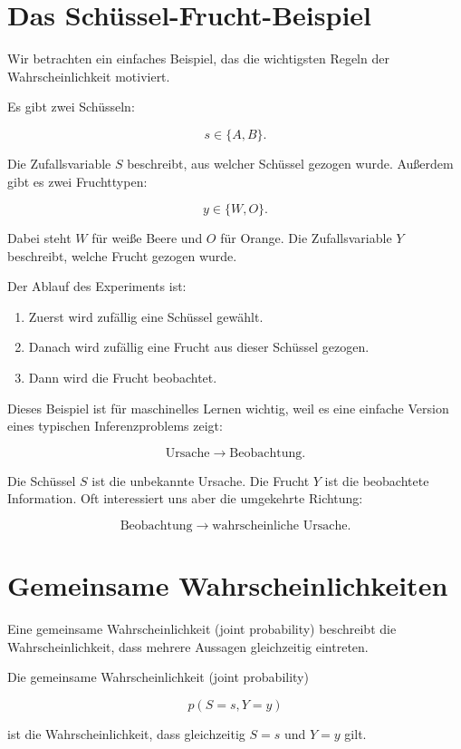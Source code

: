 \section{Das Schüssel-Frucht-Beispiel}

Wir betrachten ein einfaches Beispiel, das die wichtigsten Regeln der Wahrscheinlichkeit motiviert.

Es gibt zwei Schüsseln:

\[
    s \in \{A,B\}.
\]

Die Zufallsvariable \(S\) beschreibt, aus welcher Schüssel gezogen wurde.
Außerdem gibt es zwei Fruchttypen:

\[
    y \in \{W,O\}.
\]

Dabei steht \(W\) für weiße Beere und \(O\) für Orange.
Die Zufallsvariable \(Y\) beschreibt, welche Frucht gezogen wurde.

Der Ablauf des Experiments ist:

\begin{enumerate}
    \item Zuerst wird zufällig eine Schüssel gewählt.
    \item Danach wird zufällig eine Frucht aus dieser Schüssel gezogen.
    \item Dann wird die Frucht beobachtet.
\end{enumerate}

\begin{notebox}
Dieses Beispiel ist für maschinelles Lernen wichtig, weil es eine einfache Version eines typischen Inferenzproblems zeigt:

\[
    \text{Ursache}
    \longrightarrow
    \text{Beobachtung}.
\]

Die Schüssel \(S\) ist die unbekannte Ursache.
Die Frucht \(Y\) ist die beobachtete Information.
Oft interessiert uns aber die umgekehrte Richtung:

\[
    \text{Beobachtung}
    \longrightarrow
    \text{wahrscheinliche Ursache}.
\]
\end{notebox}

\section{Gemeinsame Wahrscheinlichkeiten}

Eine gemeinsame Wahrscheinlichkeit (joint probability) beschreibt die Wahrscheinlichkeit, dass mehrere Aussagen gleichzeitig eintreten.

\begin{definitionbox}
Die gemeinsame Wahrscheinlichkeit (joint probability)

\[
    p(S=s,Y=y)
\]

ist die Wahrscheinlichkeit, dass gleichzeitig \(S=s\) und \(Y=y\) gilt.
\end{definitionbox}

